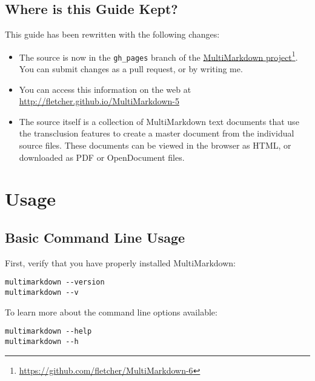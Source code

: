 \section{Where is this Guide Kept?}
\label{whereisthisguidekept}

This guide has been rewritten with the following changes:

\begin{itemize}
\item The source is now in the \texttt{gh\_pages} branch of the \href{https://github.com/fletcher/MultiMarkdown-6}{MultiMarkdown project}\footnote{\href{https://github.com/fletcher/MultiMarkdown-6}{https:\slash{}\slash{}github.com\slash{}fletcher\slash{}MultiMarkdown-6}}. You can submit changes as a pull request, or by writing me.

\item You can access this information on the web at \href{http://fletcher.github.io/MultiMarkdown-5}{http:\slash{}\slash{}fletcher.github.io\slash{}MultiMarkdown-5}

\item The source itself is a collection of MultiMarkdown text documents that use the transclusion features to create a master document from the individual source files. These documents can be viewed in the browser as HTML, or downloaded as PDF or OpenDocument files.

\end{itemize}

\chapter{Usage}
\label{usage}

\section{Basic Command Line Usage}
\label{basiccommandlineusage}

First, verify that you have properly installed MultiMarkdown:

\begin{verbatim}
multimarkdown --version
multimarkdown --v
\end{verbatim}

To learn more about the command line options available:

\begin{verbatim}
multimarkdown --help
multimarkdown --h
\end{verbatim}


